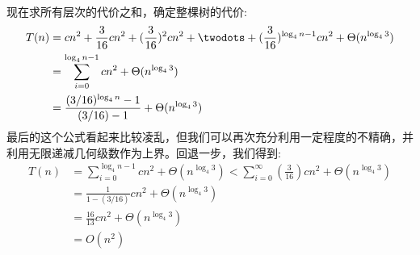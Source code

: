\documentclass[a4paper,11pt]{article}
\begin{document}
\paragraph*{}现在求所有层次的代价之和，确定整棵树的代价:
\begin{equation}
	\begin{split}
		T(n)&=cn^2+\frac{3}{16}cn^2+(\frac{3}{16})^2cn^2+\twodots+(\frac{3}{16})^{\log_{4}{n}-1}cn^2+\Theta(n^{\log_{4}{3}})\\
		&=\sum_{i=0}^{\log_{4}{n}-1}cn^2+\Theta(n^{\log_{4}{3}})\\
		&=\frac{(3/16)^{\log_{4}{n}}-1}{(3/16)-1}+\Theta(n^{\log_{4}{3}})
	\end{split}
\end{equation}
最后的这个公式看起来比较凌乱，但我们可以再次充分利用一定程度的不精确，并利用无限递减几何级数作为上界。回退一步，我们得到:
\begin{equation}
	\begin{split}
		T(n)&=\sum_{i=0}^{\log_{4}{n}-1}cn^2+\Theta(n^{\log_{4}{3}})<\sum_{i=0}^{\infty}(\frac{3}{16})cn^2+\Theta(n^{\log_{4}{3}})\\
		&=\frac{1}{1-(3/16)}cn^2+\Theta(n^{\log_{4}{3}})\\
		&=\frac{16}{13}cn^2 + \Theta(n^{\log_{4}{3}})\\
		&=O(n^2)
	\end{split}
\end{equation}
\end{document}
